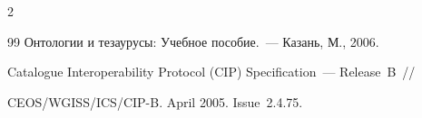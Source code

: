 \begin{multicols}{2}
{{\begin{thebibliography}{99}
Онтологии и тезаурусы: Учебное пособие.~--- Казань, М., 2006.








\label{end\stat}




Catalogue Interoperability Protocol (CIP) Specification~--- Release~B~// 

CEOS/WGISS/ICS/CIP-B. April 2005. Issue~2.4.75.



  

 \end{thebibliography}

}

}





\end{multicols}

